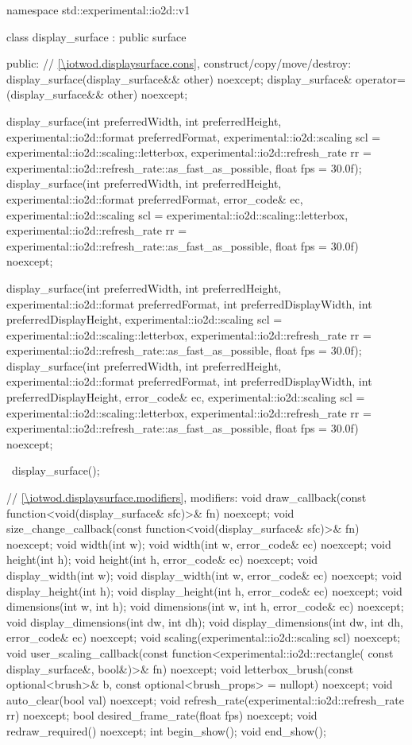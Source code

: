 \begin{codeblock}
namespace std::experimental::io2d::v1 {
  class display_surface : public surface {
  public:
    // \ref{\iotwod.displaysurface.cons}, construct/copy/move/destroy:
    display_surface(display_surface&& other) noexcept;
    display_surface& operator=(display_surface&& other) noexcept;
    
    display_surface(int preferredWidth, int preferredHeight, 
      experimental::io2d::format preferredFormat,
      experimental::io2d::scaling scl = experimental::io2d::scaling::letterbox,
      experimental::io2d::refresh_rate rr =
      experimental::io2d::refresh_rate::as_fast_as_possible, float fps = 30.0f);
    display_surface(int preferredWidth, int preferredHeight, 
      experimental::io2d::format preferredFormat, error_code& ec,
      experimental::io2d::scaling scl = experimental::io2d::scaling::letterbox,
      experimental::io2d::refresh_rate rr =
      experimental::io2d::refresh_rate::as_fast_as_possible, float fps = 30.0f) 
      noexcept;
    
    display_surface(int preferredWidth, int preferredHeight, 
      experimental::io2d::format preferredFormat,
      int preferredDisplayWidth, int preferredDisplayHeight,
      experimental::io2d::scaling scl = experimental::io2d::scaling::letterbox,
      experimental::io2d::refresh_rate rr =
      experimental::io2d::refresh_rate::as_fast_as_possible, float fps = 30.0f);
    display_surface(int preferredWidth, int preferredHeight, 
      experimental::io2d::format preferredFormat,
      int preferredDisplayWidth, int preferredDisplayHeight, error_code& ec,
      experimental::io2d::scaling scl = experimental::io2d::scaling::letterbox,
      experimental::io2d::refresh_rate rr =
      experimental::io2d::refresh_rate::as_fast_as_possible, float fps = 30.0f) 
      noexcept;
    
    ~display_surface();
    
    // \ref{\iotwod.displaysurface.modifiers}, modifiers:
    void draw_callback(const function<void(display_surface& sfc)>& fn) noexcept;
    void size_change_callback(const function<void(display_surface& sfc)>& fn)
      noexcept;
    void width(int w);
    void width(int w, error_code& ec) noexcept;
    void height(int h);
    void height(int h, error_code& ec) noexcept;
    void display_width(int w);
    void display_width(int w, error_code& ec) noexcept;
    void display_height(int h);
    void display_height(int h, error_code& ec) noexcept;
    void dimensions(int w, int h);
    void dimensions(int w, int h, error_code& ec) noexcept;
    void display_dimensions(int dw, int dh);
    void display_dimensions(int dw, int dh, error_code& ec) noexcept;
    void scaling(experimental::io2d::scaling scl) noexcept;
    void user_scaling_callback(const function<experimental::io2d::rectangle(
      const display_surface&, bool&)>& fn) noexcept;
    void letterbox_brush(const optional<brush>& b,
      const optional<brush_props> = nullopt) noexcept;
    void auto_clear(bool val) noexcept;
    void refresh_rate(experimental::io2d::refresh_rate rr) noexcept;
    bool desired_frame_rate(float fps) noexcept;
    void redraw_required() noexcept;
    int begin_show();
    void end_show();
    
}}
\end{codeblock}
